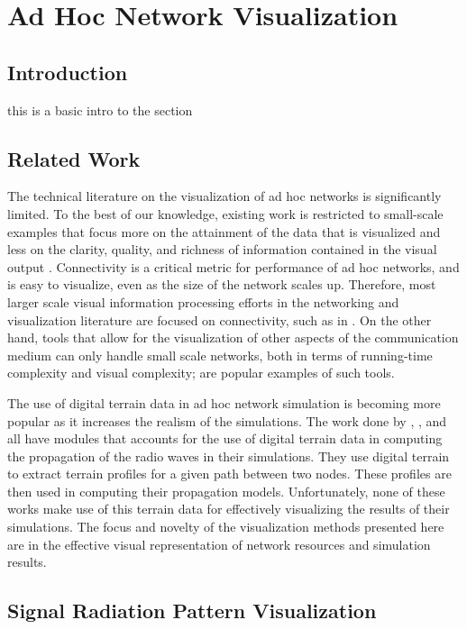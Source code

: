 \chapter{Ad Hoc Network Visualization}

\section{Introduction}
this is a basic intro to the section

\section{Related Work}
The technical literature on the visualization of ad hoc networks is significantly limited. To the best of our knowledge, existing work is restricted to small-scale examples that focus more on the attainment of the data that is visualized and less on the clarity, quality, and richness of information contained in the visual output \cite{DhoVoGue03}. Connectivity is a critical metric for performance of ad hoc networks, and is easy to visualize, even as the size of the network scales up. Therefore, most larger scale visual information processing efforts in the networking and visualization literature are focused on connectivity, such as in \cite{Bettsetetter04, HamWij04, BecEicWil95, HerMelMar00}. On the other hand, tools that allow for the visualization of other aspects of the communication medium can only handle small scale networks, both in terms of running-time complexity and visual complexity; \cite{FitSeeRei04, MatBieLau05, EstHanHei00} are popular examples of such tools.

The use of digital terrain data in ad hoc network simulation is becoming more popular as it increases the realism of the simulations.  The work done by \cite{LuiPerNic01}, \cite{BonWanSta98}, and \cite{DzaTraFil07} all have modules that accounts for the use of digital terrain data in computing the propagation of the radio waves in their simulations.  They use digital terrain to extract terrain profiles for a given path between two nodes.  These profiles are then used in computing their propagation models.  Unfortunately, none of these works make use of this terrain data for effectively visualizing the results of their simulations.  The focus and novelty of the visualization methods presented here are in the effective visual representation of network resources and simulation results.


\section{Signal Radiation Pattern Visualization}
